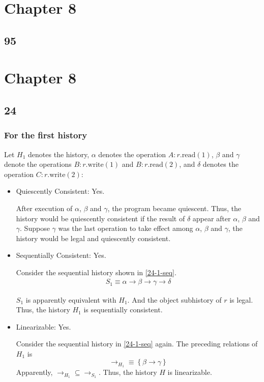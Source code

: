\documentclass[]{article}
\begin{document}
\section*{Chapter 8}

\subsection{95}





\section*{Chapter 8}
\subsection{24}
\subsubsection*{For the first history}

Let $H_1$ denotes the history, $\alpha$ denotes the
operation $A:r.\mathrm{read}(1)$, $\beta$ and $\gamma$ denote the operations
$B:r.\mathrm{write}(1)$ and $B:r.\mathrm{read}(2)$, and $\delta$ denotes the
operation $C:r.\mathrm{write}(2)$:

\begin{itemize}
    \item Quiescently Consistent: Yes.

        After execution of $\alpha$, $\beta$ and $\gamma$, the program became
        quiescent. Thus, the history would be quiescently consistent if the
        result of $\delta$ appear after $\alpha$, $\beta$ and $\gamma$. Suppose
        $\gamma$ was the last operation to take effect among $\alpha$, $\beta$
        and $\gamma$, the history would be legal and quiescently consistent.

    \item Sequentially Consistent: Yes.

        Consider the sequential history shown in \cref{24-1-seq}.
        \begin{align}
            \label{24-1-seq}
            S_1 \equiv \alpha \rightarrow \beta \rightarrow \gamma \rightarrow \delta
        \end{align}

        $S_1$ is apparently equivalent with $H_1$. And the object subhistory of
        $r$ is legal. Thus, the history $H_1$ is sequentially consistent.

    \item Linearizable: Yes.

        Consider the sequential history in \cref{24-1-seq} again. The preceding
        relations of $H_1$ is
        \[\rightarrow_{H_1} \equiv \left\{ \beta \rightarrow \gamma \right\}\]
        Apparently, $\rightarrow_{H_1} \subseteq \rightarrow_{S_1}$. Thus, the
        history $H$ is linearizable.
\end{itemize}
\end{document}
